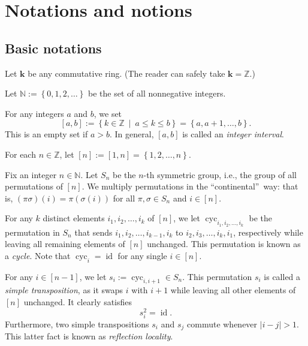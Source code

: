 \documentclass[numbers=enddot,12pt,final,onecolumn,notitlepage]{scrartcl}%
\theoremstyle{definition}
\begin{document}
\section{Notations and notions}

\subsection{Basic notations}

Let $\mathbf{k}$ be any commutative ring. (The reader can safely take
$\mathbf{k}=\mathbb{Z}$.)

Let $\mathbb{N}:=\left\{  0,1,2,\ldots\right\}  $ be the set of all
nonnegative integers.

For any integers $a$ and $b$, we set
\[
\left[  a,b\right]  :=\left\{  k\in\mathbb{Z}\ \mid\ a\leq k\leq b\right\}
=\left\{  a,a+1,\ldots,b\right\}  .
\]
This is an empty set if $a>b$. In general, $\left[  a,b\right]  $ is called an
\emph{integer interval}.

For each $n\in\mathbb{Z}$, let $\left[  n\right]  :=\left[  1,n\right]
=\left\{  1,2,\ldots,n\right\}  $.

Fix an integer $n\in\mathbb{N}$. Let $S_{n}$ be the $n$-th symmetric group,
i.e., the group of all permutations of $\left[  n\right]  $. We multiply
permutations in the \textquotedblleft continental\textquotedblright\ way: that
is, $\left(  \pi\sigma\right)  \left(  i\right)  =\pi\left(  \sigma\left(
i\right)  \right)  $ for all $\pi,\sigma\in S_{n}$ and $i\in\left[  n\right]
$.

For any $k$ distinct elements $i_{1},i_{2},\ldots,i_{k}$ of $\left[  n\right]
$, we let $\operatorname*{cyc}\nolimits_{i_{1},i_{2},\ldots,i_{k}}$ be the
permutation in $S_{n}$ that sends $i_{1},i_{2},\ldots,i_{k-1},i_{k}$ to
$i_{2},i_{3},\ldots,i_{k},i_{1}$, respectively while leaving all remaining
elements of $\left[  n\right]  $ unchanged. This permutation is known as a
\emph{cycle}. Note that $\operatorname*{cyc}\nolimits_{i}=\operatorname*{id}$
for any single $i\in\left[  n\right]  $.

For any $i\in\left[  n-1\right]  $, we let $s_{i}:=\operatorname*{cyc}%
\nolimits_{i,i+1}\in S_{n}$. This permutation $s_{i}$ is called a \emph{simple
transposition}, as it swaps $i$ with $i+1$ while leaving all other elements of
$\left[  n\right]  $ unchanged. It clearly satisfies
\begin{equation}
s_{i}^{2}=\operatorname*{id}. \label{eq.si.invol}%
\end{equation}
Furthermore, two simple transpositions $s_{i}$ and $s_{j}$ commute whenever
$\left\vert i-j\right\vert >1$. This latter fact is known as \emph{reflection
locality}.
\end{document}
